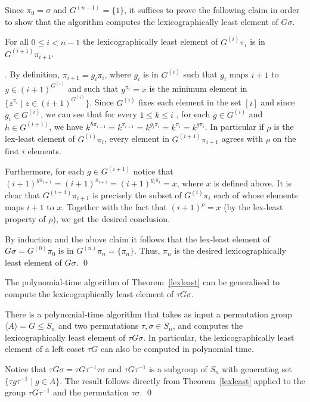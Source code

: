 \documentclass{elsart}
\newcommand{\cproof}{\noindent{\it Proof of Claim}}
\newenvironment{claimproof}{\cproof. }{\hspace*{\fill}\vspace{5mm}}
\renewcommand{\angle}[1]{\langle #1\rangle}
\begin{document}
\begin{pf}
Since $\pi_0 = \sigma$ and $G^{(n-1)} = \{ 1 \}$, it suffices to prove
the following claim in order to show that the algorithm computes the
lexicographically least element of $G\sigma$.

\begin{claim}\label{claim1}
  For all $0 \leq i <n-1$ the lexicographically least element of
  $G^{(i)}\pi_i$ is in $G^{(i+1)} \pi_{i+1}$.
\end{claim}

\begin{claimproof}
  By definition, $\pi_{i+1}=g_i\pi_i$, where $g_i$ is in $G^{(i)}$
  such that $g_i$ maps $i+1$ to $y\in (i+1)^{G^{(i)}}$ and such that
  $y^{\pi_i}=x$ is the minimum element in $\{z^{\pi_i}\mid z\in
  (i+1)^{G^{(i)}}\}$.  Since $G^{(i)}$ fixes each element in the set
  $[i]$ and since $g_i \in G^{(i)}$, we can see that for every $1 \leq
  k \leq i$ , for each $g \in G^{(i)}$ and $h \in G^{(i+1)}$, we have
  $ k^{h \pi_{i+1}} = k^{\pi_{i+1}} = k^{g_i \pi_i} = k^{\pi_i} = k^{g
    \pi_i} $. In particular if $\rho$ is the lex-least element of
  $G^{(i)} \pi_i$, every element in $G^{(i+1)} \pi_{i+1}$ agrees with
  $\rho$ on the first $i$ elements.
  
  Furthermore, for each $g\in G^{(i+1)}$ notice that $(i+1)^{g
    \pi_{i+1}} = (i+1)^{\pi_{i+1}} = (i+1)^{g_i \pi_i}=x$, where $x$
    is defined above. It is clear that $G^{(i+1)}\pi_{i+1}$ is
    precisely the subset of $G^{(i)}\pi_i$ each of whose elements maps
    $i+1$ to $x$.  Together with the fact that $(i+1)^\rho = x$ (by
    the lex-least property of $\rho$), we get the desired conclusion.
\end{claimproof}

By induction and the above claim it follows that the lex-least element
of $G\sigma=G^{(0)}\pi_0$ is in $G^{(n)}\pi_n=\{\pi_n\}$. Thus,
$\pi_n$ is the desired lexicographically least element of $G\sigma$. \qed
\end{pf}

The polynomial-time algorithm of Theorem~\ref{lexleast} can be
generalised to compute the lexicographically least element of $\tau G
\sigma$.

\begin{cor}
  There is a polynomial-time algorithm that takes as input a
  permutation group $\angle{A}=G \leq S_n$ and two permutations $\tau,
  \sigma\in S_n$, and computes the lexicographically least element of
  $\tau G \sigma$. In particular, the lexicographically least element
  of a left coset $\tau G$ can also be computed in polynomial time.
\end{cor}
\begin{pf}
  Notice that $\tau G \sigma=\tau G\tau^{-1}\tau\sigma$ and $\tau
  G\tau^{-1}$ is a subgroup of $S_n$ with generating set $\{\tau
  g\tau^{-1}\mid g\in A\}$. The result follows directly from
  Theorem~\ref{lexleast} applied to the group $\tau G\tau^{-1}$ and
  the permutation $\tau\sigma$. \qed
\end{pf}
\end{document}
